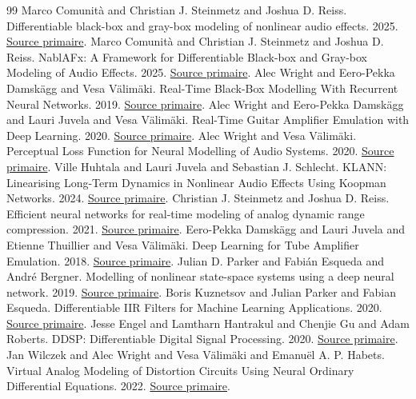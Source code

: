 \documentclass[10pt,a4paper]{article}
\begin{document}
\begin{thebibliography}{99}
Marco Comunit\`{a} and Christian J. Steinmetz and Joshua D. Reiss. Differentiable black-box and gray-box modeling of nonlinear audio effects. 2025. \href{https://doi.org/10.3389/frsip.2025.1580395}{Source primaire}.
Marco Comunit\`{a} and Christian J. Steinmetz and Joshua D. Reiss. NablAFx: A Framework for Differentiable Black-box and Gray-box Modeling of Audio Effects. 2025. \href{https://arxiv.org/abs/2502.11668}{Source primaire}.
Alec Wright and Eero-Pekka Damsk\"{a}gg and Vesa V\"{a}lim\"{a}ki. Real-Time Black-Box Modelling With Recurrent Neural Networks. 2019. \href{https://dafx.de/paper-archive/details/tieFMcaohHBxl_2yPyIGFA}{Source primaire}.
Alec Wright and Eero-Pekka Damsk\"{a}gg and Lauri Juvela and Vesa V\"{a}lim\"{a}ki. Real-Time Guitar Amplifier Emulation with Deep Learning. 2020. \href{https://doi.org/10.3390/app10030766}{Source primaire}.
Alec Wright and Vesa V\"{a}lim\"{a}ki. Perceptual Loss Function for Neural Modelling of Audio Systems. 2020. \href{https://doi.org/10.1109/ICASSP40776.2020.9052944}{Source primaire}.
Ville Huhtala and Lauri Juvela and Sebastian J. Schlecht. KLANN: Linearising Long-Term Dynamics in Nonlinear Audio Effects Using Koopman Networks. 2024. \href{https://doi.org/10.1109/LSP.2024.3389465}{Source primaire}.
Christian J. Steinmetz and Joshua D. Reiss. Efficient neural networks for real-time modeling of analog dynamic range compression. 2021. \href{https://arxiv.org/abs/2102.06200}{Source primaire}.
Eero-Pekka Damsk\"{a}gg and Lauri Juvela and Etienne Thuillier and Vesa V\"{a}lim\"{a}ki. Deep Learning for Tube Amplifier Emulation. 2018. \href{https://arxiv.org/abs/1811.00334}{Source primaire}.
Julian D. Parker and Fabi\'{a}n Esqueda and Andr\'{e} Bergner. Modelling of nonlinear state-space systems using a deep neural network. 2019. \href{https://www.dafx.de/paper-archive/details/6gVMKb8twul1KJmeOvE3ng}{Source primaire}.
Boris Kuznetsov and Julian Parker and Fabian Esqueda. Differentiable IIR Filters for Machine Learning Applications. 2020. \href{https://www.dafx.de/paper-archive/details/rA_6fTdLky8YDvH03jdufw}{Source primaire}.
Jesse Engel and Lamtharn Hantrakul and Chenjie Gu and Adam Roberts. DDSP: Differentiable Digital Signal Processing. 2020. \href{https://arxiv.org/abs/2001.04643}{Source primaire}.
Jan Wilczek and Alec Wright and Vesa V\"{a}lim\"{a}ki and Emanu\"{e}l A. P. Habets. Virtual Analog Modeling of Distortion Circuits Using Neural Ordinary Differential Equations. 2022. \href{https://dafx.de/paper-archive/2022/papers/DAFx20in22_paper_12.pdf}{Source primaire}.

\end{thebibliography}
\end{document}
